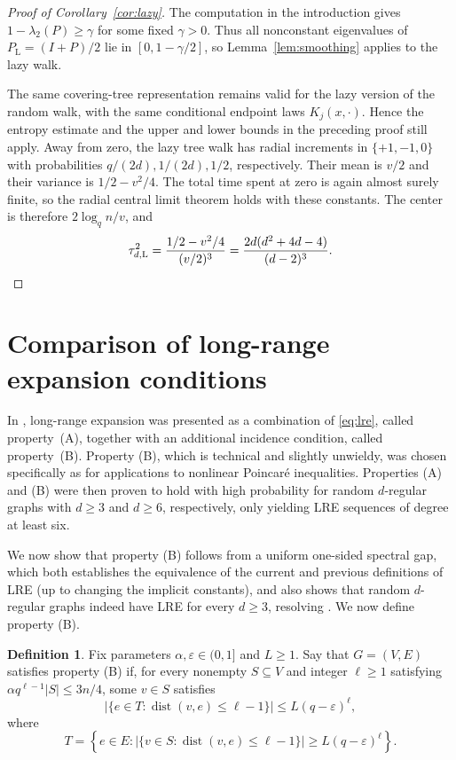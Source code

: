\documentclass[11pt,reqno]{amsart}
\theoremstyle{definition}
\newtheorem{definition}[theorem]{Definition}
\newcommand{\dist}{\operatorname{dist}}
\begin{document}
\begin{proof}[Proof of Corollary~\ref{cor:lazy}]
The computation in the introduction gives
$1-\lambda_2(P)\ge\gamma$ for some fixed $\gamma>0$.
Thus all nonconstant eigenvalues of
$P_{\mathrm L}=(I+P)/2$ lie in $[0,1-\gamma/2]$,
so Lemma~\ref{lem:smoothing} applies to the lazy walk.

The same covering-tree representation remains valid for the lazy version of the random walk, with the same
conditional endpoint laws $K_j(x,\cdot)$. Hence the entropy estimate
and the upper and lower bounds in the preceding proof still apply.
Away from zero, the lazy tree walk has radial increments in
$\{+1,-1,0\}$ with probabilities $q/(2d),1/(2d),1/2$, respectively.
Their mean is $v/2$ and their variance is $1/2-v^2/4$.
The total time spent at zero is again almost surely finite, so
the radial central limit theorem holds with these constants.
The center is therefore $2\log_q n/v$, and
\[
 \tau_{d,\mathrm L}^2
 =\frac{1/2-v^2/4}{(v/2)^3}
 =\frac{2d(d^2+4d-4)}{(d-2)^3}.\qedhere
\]
\end{proof}

\appendix

\section{Comparison of long-range expansion conditions}\label{sec:property-B}


In \cite[Definition~1.5]{ADTT}, long-range expansion was presented as a combination of \eqref{eq:lre}, called property~(A), together with an additional incidence condition, called property~(B). Property (B), which is technical and slightly unwieldy, was chosen specifically as for applications to nonlinear Poincar\'e inequalities. Properties (A) and (B) were then proven to hold with high probability for random $d$-regular graphs with $d \ge 3$ and $d \ge 6$, respectively, only yielding LRE sequences of degree at least six. 

We now show that property (B) follows from a uniform one-sided spectral gap, which both establishes the equivalence of the current and previous definitions of LRE (up to changing the implicit constants), and also 
shows that random $d$-regular graphs indeed have LRE for every $d\ge3$, resolving \cite[Problem~6.3]{ADTT}. We now define property (B).


\begin{definition}
    Fix parameters $\alpha,\varepsilon\in(0,1]$ and $L\ge1$. Say that $G = (V,E)$ satisfies property (B) if, for every nonempty $S\subseteq V$ and integer $\ell\ge1$
    satisfying $\alpha q^{\ell-1}|S|\le3n/4$,  some $v\in S$ satisfies
    \[
     \bigl|\{e\in T:\dist(v,e)\le\ell-1\}\bigr|
     \le L(q-\varepsilon)^\ell,
    \]
    where
    \[
    T=\left\{e\in E:
     \bigl|\{v\in S:\dist(v,e)\le\ell-1\}\bigr|
     \ge L(q-\varepsilon)^\ell\right\}.
    \]
\end{definition}
\end{document}
